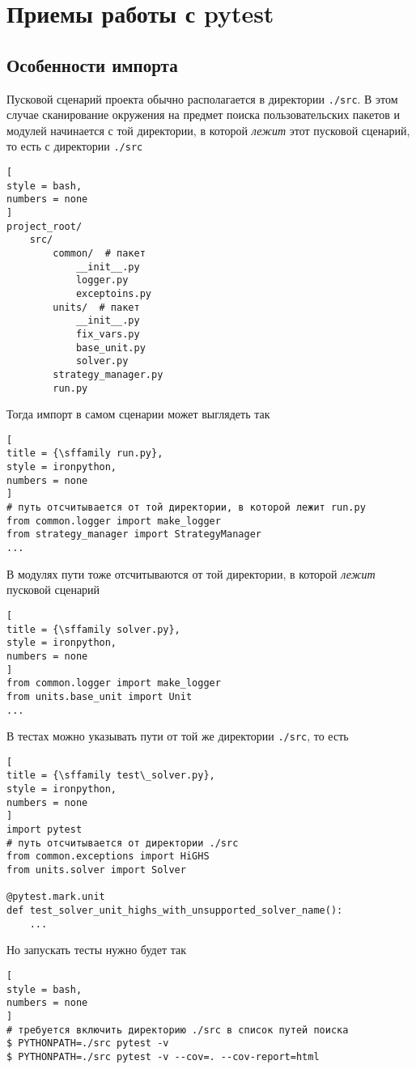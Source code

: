 \documentclass[%
	11pt,
	a4paper,
	utf8,
		]{article}
\begin{document}
\section{Приемы работы с pytest}

\subsection{Особенности импорта}

Пусковой сценарий проекта обычно располагается в директории \verb|./src|. В этом случае сканирование окружения на предмет поиска пользовательских пакетов и модулей начинается с той директории, в которой \emph{лежит} этот пусковой сценарий, то есть с директории \verb|./src|
\begin{lstlisting}[
style = bash,
numbers = none
]
project_root/
    src/
        common/  # пакет
            __init__.py
            logger.py
            exceptoins.py
        units/  # пакет
            __init__.py
            fix_vars.py
            base_unit.py
            solver.py
        strategy_manager.py
        run.py
\end{lstlisting}

Тогда импорт в самом сценарии может выглядеть так
\begin{lstlisting}[
title = {\sffamily run.py},
style = ironpython,
numbers = none
]
# путь отсчитывается от той директории, в которой лежит run.py
from common.logger import make_logger
from strategy_manager import StrategyManager
...
\end{lstlisting}

В модулях пути тоже отсчитываются от той директории, в которой \emph{лежит} пусковой сценарий
\begin{lstlisting}[
title = {\sffamily solver.py},
style = ironpython,
numbers = none
]
from common.logger import make_logger
from units.base_unit import Unit
...
\end{lstlisting}

В тестах можно указывать пути от той же директории \verb|./src|, то есть
\begin{lstlisting}[
title = {\sffamily test\_solver.py},
style = ironpython,
numbers = none
]
import pytest
# путь отсчитывается от директории ./src
from common.exceptions import HiGHS
from units.solver import Solver

@pytest.mark.unit
def test_solver_unit_highs_with_unsupported_solver_name():
    ...
\end{lstlisting}

Но запускать тесты нужно будет так
\begin{lstlisting}[
style = bash,
numbers = none
]
# требуется включить директорию ./src в список путей поиска
$ PYTHONPATH=./src pytest -v
$ PYTHONPATH=./src pytest -v --cov=. --cov-report=html
\end{lstlisting}
\end{document}
